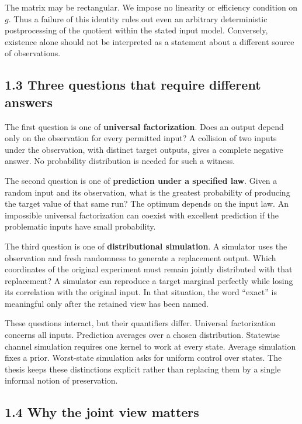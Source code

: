 \documentclass[
]{article}
\begin{document}
The matrix may be rectangular. We impose no linearity or efficiency
condition on \(g\). Thus a failure of this identity rules out even an
arbitrary deterministic postprocessing of the quotient within the stated
input model. Conversely, existence alone should not be interpreted as a
statement about a different source of observations.

\subsection{1.3 Three questions that require different
answers}\label{three-questions-that-require-different-answers}

The first question is one of \textbf{universal factorization}. Does an
output depend only on the observation for every permitted input? A
collision of two inputs under the observation, with distinct target
outputs, gives a complete negative answer. No probability distribution
is needed for such a witness.

The second question is one of \textbf{prediction under a specified law}.
Given a random input and its observation, what is the greatest
probability of producing the target value of that same run? The optimum
depends on the input law. An impossible universal factorization can
coexist with excellent prediction if the problematic inputs have small
probability.

The third question is one of \textbf{distributional simulation}. A
simulator uses the observation and fresh randomness to generate a
replacement output. Which coordinates of the original experiment must
remain jointly distributed with that replacement? A simulator can
reproduce a target marginal perfectly while losing its correlation with
the original input. In that situation, the word ``exact'' is meaningful
only after the retained view has been named.

These questions interact, but their quantifiers differ. Universal
factorization concerns all inputs. Prediction averages over a chosen
distribution. Statewise channel simulation requires one kernel to work
at every state. Average simulation fixes a prior. Worst-state simulation
asks for uniform control over states. The thesis keeps these
distinctions explicit rather than replacing them by a single informal
notion of preservation.

\subsection{1.4 Why the joint view
matters}\label{why-the-joint-view-matters}
\end{document}
